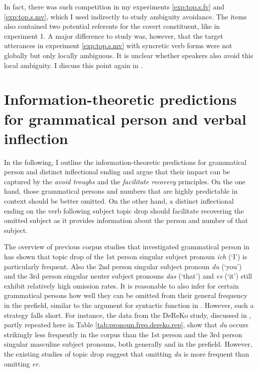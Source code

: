 In fact, there was such competition in my experiments \ref*{exp:top.s.fv} and \ref*{exp:top.s.mv}, which I used indirectly to study ambiguity avoidance.
The items also contained two potential referents for the covert constituent, like in  experiment 1.
A major difference to  study was, however, that the target utterances in experiment \ref*{exp:top.s.mv} with syncretic  verb forms were not globally but only locally ambiguous.
It is unclear whether speakers also avoid this local ambiguity.
I discuss this point again in .   

\largerpage
\section[head={Information-theoretic predictions}]{Information-theoretic predictions for grammatical person and verbal inflection}\label{sec:info.theory.person}
In the following, I outline the information-theoretic predictions for grammatical person and distinct inflectional ending and argue that their impact can be captured by the \textit{avoid troughs} and the \textit{facilitate recovery} principles. 
On the one hand, those grammatical persons and numbers that are highly predictable  in context should be better omitted.
On the other hand, a distinct inflectional ending  on the verb following subject topic drop should facilitate recovering  the omitted subject as it provides information about the person and number of that subject.

The overview of previous corpus studies that investigated grammatical person in  has shown that topic drop of the 1st person singular subject pronoun \textit{ich} (`I') is particularly frequent.
Also the 2nd person singular subject pronoun \textit{du} (`you') and the 3rd person singular neuter subject pronouns \textit{das} (`that') and \textit{es} (`it') still exhibit relatively high omission rates.
It is reasonable to also infer for certain grammatical persons how well they can be omitted from their general frequency in the prefield, similar to the argument for syntactic function in .
However, such a strategy falls short.
For instance, the data from the DeReKo study,   discussed in , partly repeated here in Table \ref{tab:pronoun.freq.dereko.rep}, show that \textit{du} occurs strikingly less frequently in the corpus than the 1st person and the 3rd person singular masculine subject pronouns, both generally and in the prefield.
However, the existing studies of topic drop suggest that omitting \textit{du} is more frequent than omitting \textit{er}.

